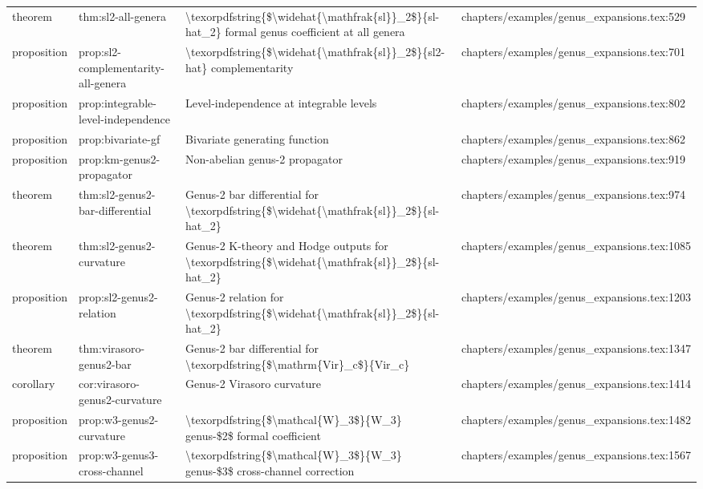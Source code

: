 \documentclass[11pt]{article}
\begin{document}
\begin{longtable}{L{0.10\textwidth}L{0.26\textwidth}L{0.42\textwidth}L{0.22\textwidth}}
theorem & thm:sl2-all-genera & \textbackslash{}texorpdfstring\{\$\textbackslash{}widehat\{\textbackslash{}mathfrak\{sl\}\}\_2\$\}\{sl-hat\_2\} formal genus coefficient at all genera & chapters/examples/genus\_expansions.tex:529\\
proposition & prop:sl2-complementarity-all-genera & \textbackslash{}texorpdfstring\{\$\textbackslash{}widehat\{\textbackslash{}mathfrak\{sl\}\}\_2\$\}\{sl2-hat\} complementarity & chapters/examples/genus\_expansions.tex:701\\
proposition & prop:integrable-level-independence & Level-independence at integrable levels & chapters/examples/genus\_expansions.tex:802\\
proposition & prop:bivariate-gf & Bivariate generating function & chapters/examples/genus\_expansions.tex:862\\
proposition & prop:km-genus2-propagator & Non-abelian genus-2 propagator & chapters/examples/genus\_expansions.tex:919\\
theorem & thm:sl2-genus2-bar-differential & Genus-2 bar differential for \textbackslash{}texorpdfstring\{\$\textbackslash{}widehat\{\textbackslash{}mathfrak\{sl\}\}\_2\$\}\{sl-hat\_2\} & chapters/examples/genus\_expansions.tex:974\\
theorem & thm:sl2-genus2-curvature & Genus-2 K-theory and Hodge outputs for \textbackslash{}texorpdfstring\{\$\textbackslash{}widehat\{\textbackslash{}mathfrak\{sl\}\}\_2\$\}\{sl-hat\_2\} & chapters/examples/genus\_expansions.tex:1085\\
proposition & prop:sl2-genus2-relation & Genus-2 relation for \textbackslash{}texorpdfstring\{\$\textbackslash{}widehat\{\textbackslash{}mathfrak\{sl\}\}\_2\$\}\{sl-hat\_2\} & chapters/examples/genus\_expansions.tex:1203\\
theorem & thm:virasoro-genus2-bar & Genus-2 bar differential for \textbackslash{}texorpdfstring\{\$\textbackslash{}mathrm\{Vir\}\_c\$\}\{Vir\_c\} & chapters/examples/genus\_expansions.tex:1347\\
corollary & cor:virasoro-genus2-curvature & Genus-2 Virasoro curvature & chapters/examples/genus\_expansions.tex:1414\\
proposition & prop:w3-genus2-curvature & \textbackslash{}texorpdfstring\{\$\textbackslash{}mathcal\{W\}\_3\$\}\{W\_3\} genus-\$2\$ formal coefficient & chapters/examples/genus\_expansions.tex:1482\\
proposition & prop:w3-genus3-cross-channel & \textbackslash{}texorpdfstring\{\$\textbackslash{}mathcal\{W\}\_3\$\}\{W\_3\} genus-\$3\$ cross-channel correction & chapters/examples/genus\_expansions.tex:1567\\

\end{longtable}
\end{document}
